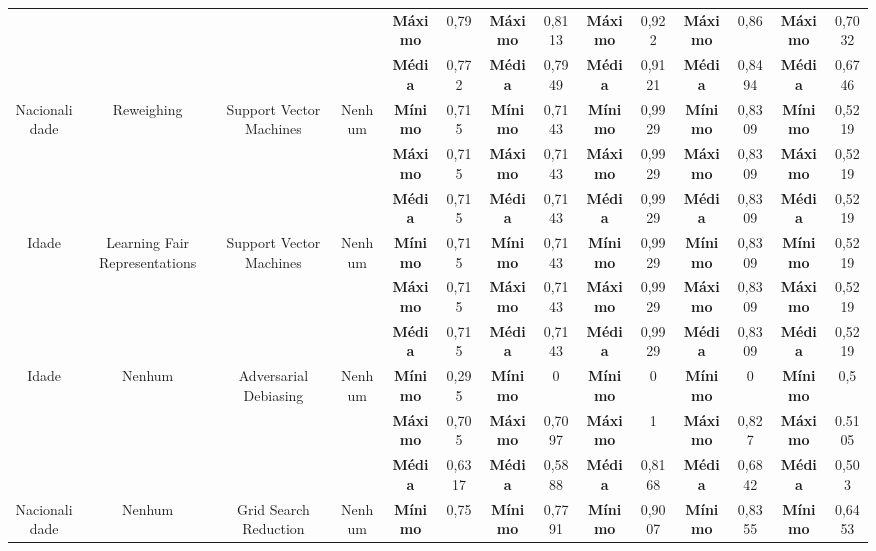 \documentclass[portugues]{ic-tese}
\begin{document}
\begin{table}[H]
\begin{center}
{\begin{tabular}{c|c|c|c|c|c|c|c|c|c|c|c|c|c}
             & & & & \textbf{Máximo} & 0,79 & \textbf{Máximo} & 0,8113 & \textbf{Máximo} & 0,922 & \textbf{Máximo} & 0,86 & \textbf{Máximo} & 0,7032 \\
             & & & & \textbf{Média} & 0,772 & \textbf{Média} & 0,7949 & \textbf{Média} & 0,9121 & \textbf{Média} & 0,8494 & \textbf{Média} & 0,6746 \\
            \hline
            \multirow{3}{*}{Nacionalidade} & \multirow{3}{*}{Reweighing} & \multirow{3}{*}{Support Vector Machines} & \multirow{3}{*}{Nenhum} & \textbf{Mínimo} & 0,715 & \textbf{Mínimo} & 0,7143 & \textbf{Mínimo} & 0,9929 & \textbf{Mínimo} & 0,8309 & \textbf{Mínimo} & 0,5219 \\
             & & & & \textbf{Máximo} & 0,715 & \textbf{Máximo} & 0,7143 & \textbf{Máximo} & 0,9929 & \textbf{Máximo} & 0,8309 & \textbf{Máximo} & 0,5219 \\
             & & & & \textbf{Média} & 0,715 & \textbf{Média} & 0,7143 & \textbf{Média} & 0,9929 & \textbf{Média} & 0,8309 & \textbf{Média} & 0,5219 \\
            \hline
            \multirow{3}{*}{Idade} & \multirow{3}{*}{Learning Fair Representations} & \multirow{3}{*}{Support Vector Machines} & \multirow{3}{*}{Nenhum} & \textbf{Mínimo} & 0,715 & \textbf{Mínimo} & 0,7143 & \textbf{Mínimo} & 0,9929 & \textbf{Mínimo} & 0,8309 & \textbf{Mínimo} & 0,5219 \\
             & & & & \textbf{Máximo} & 0,715 & \textbf{Máximo} & 0,7143 & \textbf{Máximo} & 0,9929 & \textbf{Máximo} & 0,8309 & \textbf{Máximo} & 0,5219 \\
             & & & & \textbf{Média} & 0,715 & \textbf{Média} & 0,7143 & \textbf{Média} & 0,9929 & \textbf{Média} & 0,8309 & \textbf{Média} & 0,5219 \\
            \hline
            \multirow{3}{*}{Idade} & \multirow{3}{*}{Nenhum} & \multirow{3}{*}{Adversarial Debiasing} & \multirow{3}{*}{Nenhum} & \textbf{Mínimo} & 0,295 & \textbf{Mínimo} & 0 & \textbf{Mínimo} & 0 & \textbf{Mínimo} & 0 & \textbf{Mínimo} & 0,5 \\
             & & & & \textbf{Máximo} & 0,705 & \textbf{Máximo} & 0,7097 & \textbf{Máximo} & 1 & \textbf{Máximo} & 0,827 & \textbf{Máximo} & 0.5105 \\
             & & & & \textbf{Média} & 0,6317 & \textbf{Média} & 0,5888 & \textbf{Média} & 0,8168 & \textbf{Média} & 0,6842 & \textbf{Média} & 0,503 \\
            \hline
            \multirow{3}{*}{Nacionalidade} & \multirow{3}{*}{Nenhum} & \multirow{3}{*}{Grid Search Reduction} & \multirow{3}{*}{Nenhum} & \textbf{Mínimo} & 0,75 & \textbf{Mínimo} & 0,7791 & \textbf{Mínimo} & 0,9007 & \textbf{Mínimo} & 0,8355 & \textbf{Mínimo} & 0,6453 \\

\end{tabular}}
\end{center}
\end{table}
\end{document}
